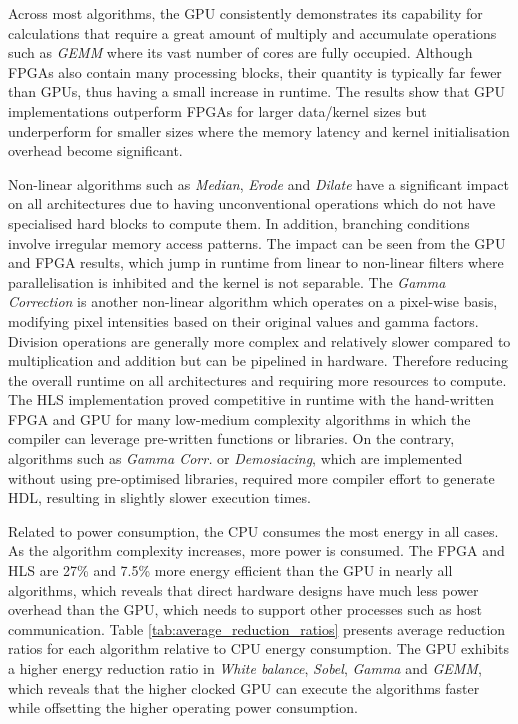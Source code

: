 Across most algorithms, the GPU consistently demonstrates its capability for calculations that require a great amount of multiply and accumulate operations such as \textit{GEMM} where its vast number of cores are fully occupied. Although FPGAs also contain many processing blocks, their quantity is typically far fewer than GPUs, thus having a small increase in runtime. The results show that GPU implementations outperform FPGAs for larger data/kernel sizes but underperform for smaller sizes where the memory latency and kernel initialisation overhead become significant.

Non-linear algorithms such as \textit{Median}, \textit{Erode} and \textit{Dilate} have a significant impact on all architectures due to having unconventional operations which do not have specialised hard blocks to compute them. In addition, branching conditions involve irregular memory access patterns. The impact can be seen from the GPU and FPGA results, which jump in runtime from linear to non-linear filters where parallelisation is inhibited and the kernel is not separable. The \textit{Gamma Correction} is another non-linear algorithm which operates on a pixel-wise basis, modifying pixel intensities based on their original values and gamma factors. Division operations are generally more complex and relatively slower compared to multiplication and addition but can be pipelined in hardware. Therefore reducing the overall runtime on all architectures and requiring more resources to compute. The HLS implementation proved competitive in runtime with the hand-written FPGA and GPU for many low-medium complexity algorithms in which the compiler can leverage pre-written functions or libraries. On the contrary, algorithms such as \textit{Gamma Corr.} or \textit{Demosiacing}, which are implemented without using pre-optimised libraries, required more compiler effort to generate HDL, resulting in slightly slower execution times.


Related to power consumption, the CPU consumes the most energy in all cases. As the algorithm complexity increases, more power is consumed. The FPGA and HLS are  27\% and 7.5\% more energy efficient than the GPU in nearly all algorithms, which reveals that direct hardware designs have much less power overhead than the GPU, which needs to support other processes such as host communication. Table \ref{tab:average_reduction_ratios} presents average reduction ratios for each algorithm relative to CPU energy consumption. The GPU exhibits a higher energy reduction ratio in \textit{White balance}, \textit{Sobel}, \textit{Gamma} and \textit{GEMM}, which reveals that the higher clocked GPU can execute the algorithms faster while offsetting the higher operating power consumption.




